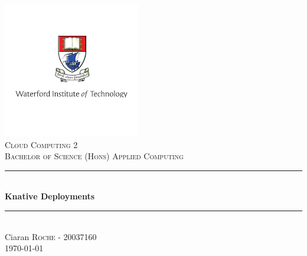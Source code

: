 \begin{titlepage}

\newcommand{\HRule}{\rule{\linewidth}{0.5mm}}

\center

\includegraphics{images/logo.png}\\
\textsc{\Large Cloud Computing 2}\\[0.5cm]
\textsc{\large Bachelor of Science (Hons) Applied Computing }\\[0.5cm] 


\HRule \\[0.4cm]
{ \huge \bfseries Knative Deployments}\\[0.4cm] 
\HRule \\[1.5cm]

\Large Ciaran \textsc{Roche} - 20037160\\[3cm]


{\large \today}\\[1cm]

\vfill 

\end{titlepage}
